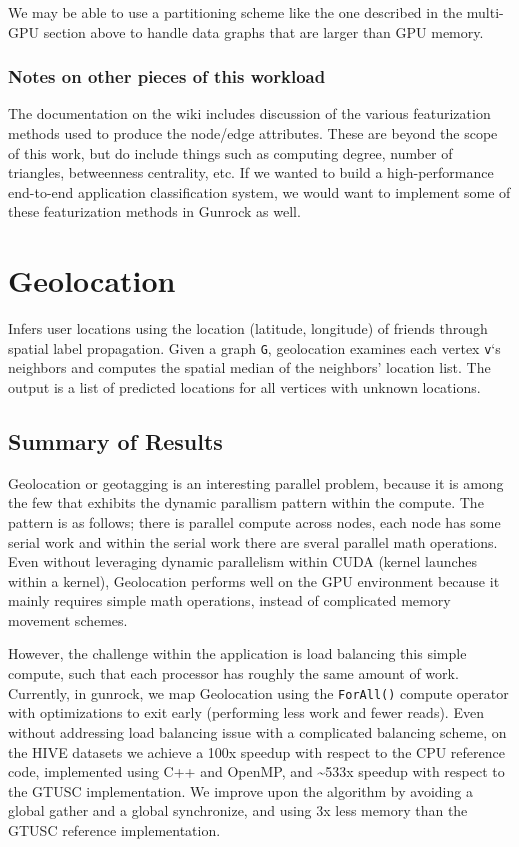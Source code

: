 \documentclass[10pt,oneside]{memoir}
\begin{document}
We may be able to use a partitioning scheme like the one described in
the multi-GPU section above to handle data graphs that are larger than
GPU memory.

\hypertarget{notes-on-other-pieces-of-this-workload}{%
\subsection{Notes on other pieces of this
workload}\label{notes-on-other-pieces-of-this-workload}}

The documentation on the wiki includes discussion of the various
featurization methods used to produce the node/edge attributes. These
are beyond the scope of this work, but do include things such as
computing degree, number of triangles, betweenness centrality, etc. If
we wanted to build a high-performance end-to-end application
classification system, we would want to implement some of these
featurization methods in Gunrock as well.

\hypertarget{geolocation-1}{%
\chapter{Geolocation}\label{geolocation-1}}

Infers user locations using the location (latitude, longitude) of
friends through spatial label propagation. Given a graph \texttt{G},
geolocation examines each vertex \texttt{v}`s neighbors and computes the
spatial median of the neighbors' location list. The output is a list of
predicted locations for all vertices with unknown locations.

\hypertarget{summary-of-results-1}{%
\section{Summary of Results}\label{summary-of-results-1}}

Geolocation or geotagging is an interesting parallel problem, because it
is among the few that exhibits the dynamic parallism pattern within the
compute. The pattern is as follows; there is parallel compute across
nodes, each node has some serial work and within the serial work there
are sveral parallel math operations. Even without leveraging dynamic
parallelism within CUDA (kernel launches within a kernel), Geolocation
performs well on the GPU environment because it mainly requires simple
math operations, instead of complicated memory movement schemes.

However, the challenge within the application is load balancing this
simple compute, such that each processor has roughly the same amount of
work. Currently, in gunrock, we map Geolocation using the
\texttt{ForAll()} compute operator with optimizations to exit early
(performing less work and fewer reads). Even without addressing load
balancing issue with a complicated balancing scheme, on the HIVE
datasets we achieve a 100x speedup with respect to the CPU reference
code, implemented using C++ and OpenMP, and \textasciitilde{}533x
speedup with respect to the GTUSC implementation. We improve upon the
algorithm by avoiding a global gather and a global synchronize, and
using 3x less memory than the GTUSC reference implementation.
\end{document}
